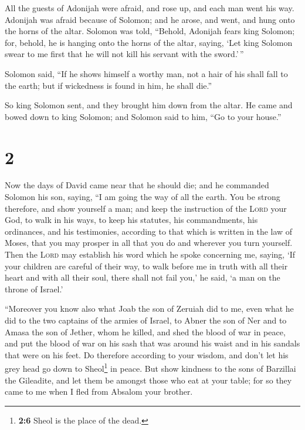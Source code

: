  All the guests of Adonijah were afraid, and rose up, and
each man went his way.  Adonijah was afraid because of
Solomon; and he arose, and went, and hung onto the horns of the altar.
 Solomon was told, ``Behold, Adonijah fears king Solomon;
for, behold, he is hanging onto the horns of the altar, saying, `Let
king Solomon swear to me first that he will not kill his servant with
the sword.'\,''

 Solomon said, ``If he shows himself a worthy man, not a
hair of his shall fall to the earth; but if wickedness is found in him,
he shall die.''

 So king Solomon sent, and they brought him down from the
altar. He came and bowed down to king Solomon; and Solomon said to him,
``Go to your house.''

\hypertarget{section-1}{%
\section{2}\label{section-1}}

 Now the days of David came near that he should die; and
he commanded Solomon his son, saying,  ``I am going the
way of all the earth. You be strong therefore, and show yourself a man;
 and keep the instruction of the \textsc{Lord} your God,
to walk in his ways, to keep his statutes, his commandments, his
ordinances, and his testimonies, according to that which is written in
the law of Moses, that you may prosper in all that you do and wherever
you turn yourself.  Then the \textsc{Lord} may establish
his word which he spoke concerning me, saying, `If your children are
careful of their way, to walk before me in truth with all their heart
and with all their soul, there shall not fail you,' he said, `a man on
the throne of Israel.'

 ``Moreover you know also what Joab the son of Zeruiah did
to me, even what he did to the two captains of the armies of Israel, to
Abner the son of Ner and to Amasa the son of Jether, whom he killed, and
shed the blood of war in peace, and put the blood of war on his sash
that was around his waist and in his sandals that were on his feet.
 Do therefore according to your wisdom, and don't let his
grey head go down to Sheol\footnote{\textbf{2:6} Sheol is the place of
  the dead.} in peace.  But show kindness to the sons of
Barzillai the Gileadite, and let them be amongst those who eat at your
table; for so they came to me when I fled from Absalom your brother.

